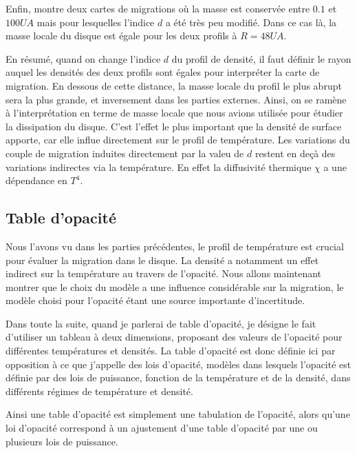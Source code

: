 Enfin,  montre deux cartes de migrations où la masse est conservée entre $0.1$ et $100\unit{UA}$ mais pour lesquelles l'indice $d$ a été très peu modifié. Dans ce cas là, la masse locale du disque est égale pour les deux profils à $R=48\unit{UA}$. 

\bigskip

En résumé, quand on change l'indice $d$ du profil de densité, il faut définir le rayon auquel les densités des deux profils sont égales pour interpréter la carte de migration. En dessous de cette distance, la masse locale du profil le plus abrupt sera la plus grande, et inversement dans les parties externes. Ainsi, on se ramène à l'interprétation en terme de masse locale que nous avions utilisée pour étudier la dissipation du disque. C'est l'effet le plus important que la densité de surface apporte, car elle influe directement sur le profil de température. Les variations du couple de migration induites directement par la valeu de $d$ restent en deçà des variations indirectes via la température. En effet la diffusivité thermique $\chi$ a une dépendance en $T^4$.

\subsection{Table d'opacité}\label{sec:influence_opacity_table}
Nous l'avons vu dans les parties précédentes, le profil de température est crucial pour évaluer la migration dans le disque. La densité a notamment un effet indirect sur la température au travers de l'opacité. Nous allons maintenant montrer que le choix du modèle a une influence considérable sur la migration, le modèle choisi pour l'opacité étant une source importante d'incertitude.

Dans toute la suite, quand je parlerai de table d'opacité, je désigne le fait d'utiliser un tableau à deux dimensions,
proposant des valeurs de l'opacité pour différentes températures et densités. La table d'opacité est donc définie ici par
opposition à ce que j'appelle des lois d'opacité, modèles dans lesquels l'opacité est définie par des lois de puissance,
fonction de la température et de la densité, dans différents régimes de température et densité.

Ainsi une table d'opacité est simplement une tabulation de l'opacité, alors qu'une loi d'opacité correspond à un ajustement d'une table d'opacité par
une ou plusieurs lois de puissance. 

\bigskip

